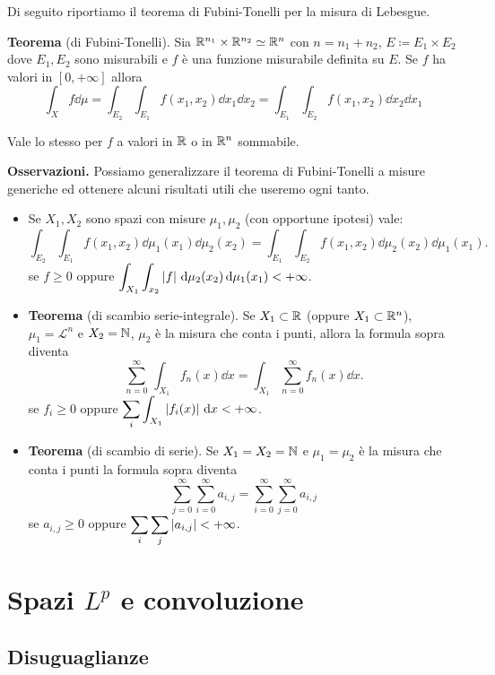 \documentclass[a4paper, 12pt]{report}
\begin{document}
Di seguito riportiamo il teorema di Fubini-Tonelli per la misura di Lebesgue.

\textbf{Teorema} (di Fubini-Tonelli).
Sia $\mathbb R^{n_1} \times \mathbb R^{n_2} \simeq \mathbb R^n$ con $n = n_1 + n_2$, $ E \coloneqq E_1 \times E_2 $ dove $E_1, E_2$ sono misurabili e $f$ è una funzione misurabile definita su $E$.
Se $f$ ha valori in $[0,+\infty]$ allora
$$
\int_X f \dd \mu 
= \int_{E_2} \int_{E_1} f(x_1,x_2) \dd x_1 \dd x_2 
= \int_{E_1} \int_{E_2} f(x_1,x_2) \dd x_2 \dd x_1
$$ 

Vale lo stesso per $f$ a valori in $\mathbb R$ o in $\mathbb R^n$ sommabile.

\textbf{Osservazioni.}
Possiamo generalizzare il teorema di Fubini-Tonelli a misure generiche ed ottenere alcuni risultati utili che useremo ogni tanto.
\begin{itemize}
	\item Se $X_1, X_2$ sono spazi con misure $\mu_1,\mu_2$ (con opportune ipotesi) vale:
		$$
		\int_{E_2} \int_{E_1} f(x_1,x_2) \dd \mu_1(x_1)  \dd \mu_2(x_2) 
		= \int_{E_1} \int_{E_2} f(x_1,x_2) \dd \mu_2(x_2)  \dd \mu_1(x_1).
		$$ 
		se $f\geq 0$ oppure $\displaystyle \int_{X_1} \int_{x_2} \left| f \right| \,\mathrm{d} \mu_2(x_2)  \,\mathrm{d} \mu_1(x_1) < + \infty $.
	
	\item \textbf{Teorema} (di scambio serie-integrale). Se $X_1 \subset \mathbb R$ (oppure $X_1 \subset \mathbb R^n$), $\mu_1 = \mathscr L^n$ e $X_2 = \mathbb N$, $\mu_2$ è la misura che conta i punti, allora la formula sopra diventa
		$$
		\sum_{n=0}^{\infty} \, \int_{X_1} f_n(x) \dd x  
		= \int_{X_1} \sum_{n=0}^{\infty} f_n(x)  \dd x.
		$$ 
		se $f_i \geq 0$ oppure $\displaystyle \sum_{i} \int_{X_1} \left| f_i(x) \right| \,\mathrm{d} x  < + \infty $.
	
	\item \textbf{Teorema} (di scambio di serie). Se $X_1 = X_2 = \mathbb N$ e $\mu_1 = \mu_2$ è la misura che conta i punti la formula sopra diventa
		$$
		\sum_{j=0}^{\infty} \sum_{i=0}^{\infty} a_{i,j}  
		= \sum_{i=0}^{\infty} \sum_{j=0}^{\infty} a_{i,j} 
		$$ 
		se $a_{i,j} \geq 0$ oppure $\displaystyle \sum_{i} \sum_{j} \left| a_{i,j} \right| < +\infty $.
\end{itemize}

\chapter{Spazi $L^p$ e convoluzione}

\section{Disuguaglianze}
\end{document}
